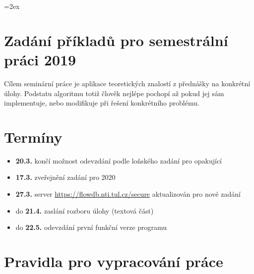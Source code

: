 \documentclass[a4paper,10pt]{article}
\begin{document}
\parskip=2ex
\parindent=0pt
\pagestyle{empty}
 \section*{Zadání příkladů pro semestrální práci 2019}

 Cílem seminární práce je aplikace teoretických znalostí z přednášky na konkrétní úlohy.
 Podstatu algoritmu totiž člověk nejlépe pochopí až pokud jej sám implementuje, nebo modifikuje při řešení konkrétního problému.
 
 \section{Termíny}
 \begin{itemize}
  \item {\bf 20.3.} končí možnost odevzdání podle loňského zadání pro opakující
  \item {\bf 17.3.} zveřejnění zadání pro 2020
  \item {\bf 27.3.} server \url{https://flowdb.nti.tul.cz/secure} aktualizován pro nové zadání
  \item do {\bf 21.4.} zaslání rozboru úlohy (textová část)
  \item do {\bf 22.5.} odevzdání první funkční verze programu
 \end{itemize}

 \section{Pravidla pro vypracování práce}
\end{document}
